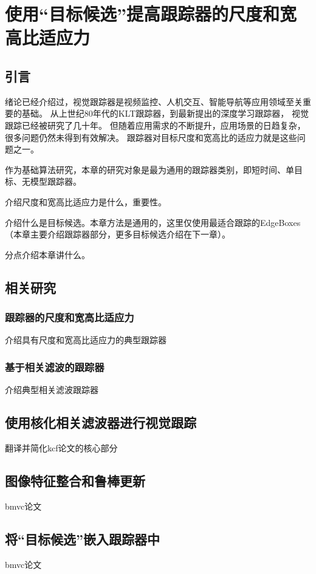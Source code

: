 \chapter{使用``目标候选''提高跟踪器的尺度和宽高比适应力}
\label{chapbmvc}

\section{引言}
绪论已经介绍过，视觉跟踪器是视频监控、人机交互、智能导航等应用领域至关重要的基础。
从上世纪80年代的KLT跟踪器，到最新提出的深度学习跟踪器，
视觉跟踪已经被研究了几十年。
但随着应用需求的不断提升，应用场景的日趋复杂，很多问题仍然未得到有效解决。
跟踪器对目标尺度和宽高比的适应力就是这些问题之一。

作为基础算法研究，本章的研究对象是最为通用的跟踪器类别，即短时间、单目标、无模型跟踪器。




介绍尺度和宽高比适应力是什么，重要性。

介绍什么是目标候选。本章方法是通用的，这里仅使用最适合跟踪的EdgeBoxes（本章主要介绍跟踪器部分，更多目标候选介绍在下一章）。

分点介绍本章讲什么。

\section{相关研究}
\subsection{跟踪器的尺度和宽高比适应力}
介绍具有尺度和宽高比适应力的典型跟踪器
\subsection{基于相关滤波的跟踪器}
介绍典型相关滤波跟踪器

\section{使用核化相关滤波器进行视觉跟踪}
翻译并简化kcf论文的核心部分

\section{图像特征整合和鲁棒更新}
bmvc论文

\section{将``目标候选''嵌入跟踪器中}
bmvc论文

